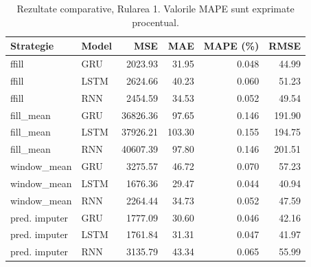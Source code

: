 \begin{table}[H]
\centering
\caption{Rezultate comparative, Rularea 1. Valorile MAPE sunt exprimate procentual.}
\label{tab:run1}
\begin{tabular}{llrrrr}
\toprule
\textbf{Strategie} & \textbf{Model} & \textbf{MSE} & \textbf{MAE} & \textbf{MAPE (\%)} & \textbf{RMSE} \\
\midrule
ffill              & GRU  & 2023.93  & 31.95  & 0.048 & 44.99  \\
ffill              & LSTM & 2624.66  & 40.23  & 0.060 & 51.23  \\
ffill              & RNN  & 2454.59  & 34.53  & 0.052 & 49.54  \\
\midrule
fill\_mean         & GRU  & 36826.36 & 97.65  & 0.146 & 191.90 \\
fill\_mean         & LSTM & 37926.21 & 103.30 & 0.155 & 194.75 \\
fill\_mean         & RNN  & 40607.39 & 97.80  & 0.146 & 201.51 \\
\midrule
window\_mean       & GRU  & 3275.57  & 46.72  & 0.070 & 57.23  \\
window\_mean       & LSTM & 1676.36  & 29.47  & 0.044 & 40.94  \\
window\_mean       & RNN  & 2264.44  & 34.73  & 0.052 & 47.59  \\
\midrule
pred. imputer      & GRU  & 1777.09  & 30.60  & 0.046 & 42.16  \\
pred. imputer      & LSTM & 1761.84  & 31.31  & 0.047 & 41.97  \\
pred. imputer      & RNN  & 3135.79  & 43.34  & 0.065 & 55.99  \\
\bottomrule
\end{tabular}
\end{table}

